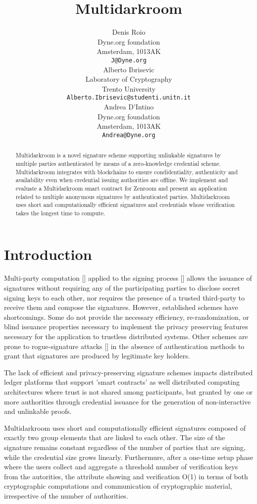 \documentclass{article}
\title{Multidarkroom}
\author{Denis Roio \\
	Dyne.org foundation \\
	Amsterdam, 1013AK \\
	\texttt{J@Dyne.org} \\
	\And
	Alberto Ibrisevic \\
	Laboratory of Cryptography\\
	Trento University\\
	\texttt{Alberto.Ibrisevic@studenti.unitn.it} \\
    \And
    Andrea D'Intino \\
    Dyne.org foundation \\
    Amsterdam, 1013AK \\
    \texttt{Andrea@Dyne.org} \\
}
\begin{document}
\maketitle

\begin{abstract}
  Multidarkroom is a novel signature scheme supporting unlinkable
  signatures by multiple parties authenticated by means of a
  zero-knowledge credential scheme. Multidarkroom integrates with
  blockchains to ensure condidentiality, authenticity and availability
  even when credential issuing authorities are offline. We implement
  and evaluate a Multidarkroom smart contract for Zenroom and present
  an application related to multiple anonymous signatures by
  authenticated parties. Multidarkroom uses short and computationally
  efficient signatures and credentials whose verification takes the
  longest time to compute.
\end{abstract}




\section{Introduction}
Multi-party computation [] applied to the signing process [] allows
the issuance of signatures without requiring any of the participating
parties to disclose secret signing keys to each other, nor requires
the presence of a trusted third-party to receive them and compose the
signatures. However, established schemes have shortcomings. Some do
not provide the necessary efficiency, re-randomization, or blind
issuance properties necessary to implement the privacy preserving
features necessary for the application to trustless distributed
systems. Other schemes are prone to rogue-signature attacks [] in the
absence of authentication methods to grant that signatures are
produced by legitimate key holders.

The lack of efficient and privacy-preserving signature schemes impacts
distributed ledger platforms that support 'smart contracts' as well
distributed computing architectures where trust is not shared among
participants, but granted by one or more authorities through
credential issuance for the generation of non-interactive and
unlinkable proofs.

Multidarkroom uses short and computationally efficient signatures
composed of exactly two group elements that are linked to each
other. The size of the signature remains constant regardless of the
number of parties that are signing, while the credential size grows
linearly. Furthermure, after a one-time setup phase where the users
collect and aggregate a threshold number of verification keys from the
autorities, the attribute showing and verification O(1) in terms of
both cryptographic computations and communication of cryptographic
material, irrespective of the number of authorities.
\end{document}
